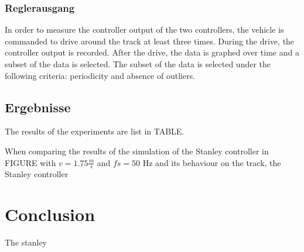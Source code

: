 \documentclass[arbeit=studie,oneside,BCOR=12mm]{ArbeitRST}
\begin{document}
\subsection{Reglerausgang}

In order to measure the controller output of the two controllers, the vehicle
is commanded to drive around the track at least three times. During the drive, the
controller output is recorded. After the drive, the data is graphed over time
and a subset of the data is selected. The subset of the data is selected under
the following criteria: periodicity and absence of outliers.

\section{Ergebnisse}

The results of the experiments are list in TABLE. 


When comparing the results of the simulation of the Stanley controller in
FIGURE with $v = 1.75 \frac{m}{s}$ and $fs = 50$ Hz and its behaviour on the
track, the Stanley controller 

\chapter{Conclusion}

The stanley 
\end{document}
